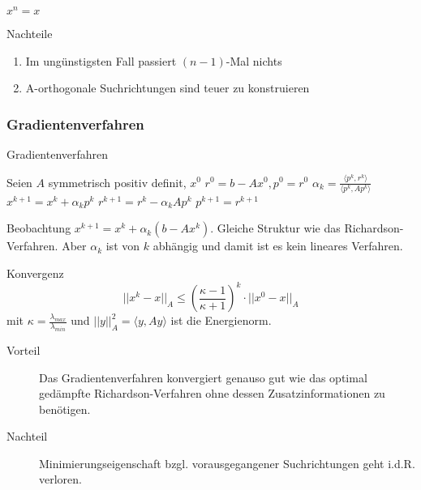 \begin{theorem}
	$x^{n}=x$
\end{theorem}
\begin{remark}
	Nachteile
	\begin{enumerate}
		\item Im ungünstigsten Fall passiert $(n-1)$-Mal nichts
		\item A-orthogonale Suchrichtungen sind teuer zu konstruieren
	\end{enumerate}
\end{remark}

\subsubsection{Gradientenverfahren}

\begin{algorithm}
	\caption{Gradientenverfahren}
	\begin{algorithmic}
		\STATE  Seien $A$ symmetrisch positiv definit, $x^{0}$
		\STATE $r^{0}=b-Ax^{0}, p^{0}=r^{0}$
			\STATE $\alpha_{k} = \frac{\langle p^{k},r^{k}\rangle}{\langle p^{k},Ap^{k}\rangle}$
			\STATE $x^{k+1} = x^{k} + \alpha_{k}p^{k}$
			\STATE $r^{k+1} = r^{k} - \alpha_{k}Ap^{k}$
			\STATE $p^{k+1}=r^{k+1}$
		\ENDFOR
	\end{algorithmic}
\end{algorithm}

\begin{remark}
	Beobachtung $x^{k+1}=x^{k}+\alpha_{k}(b-Ax^{k})$. Gleiche Struktur wie das Richardson-Verfahren. Aber $\alpha_{k}$ ist von $k$
	abhängig und damit ist es kein lineares Verfahren.
\end{remark}

\begin{theorem}
	Konvergenz
	\\
	$$||x^{k}-x||_{A}\leq \left( \frac{\kappa - 1}{\kappa +1}\right)^{k}\cdot || x^{0}-x||_{A}$$
	mit $\kappa = \frac{\lambda_{max}}{\lambda_{min}}$ und $||y||^{2}_{A}=\langle y, Ay \rangle$ ist die Energienorm.
\end{theorem}

\begin{description}
	\item[Vorteil] Das Gradientenverfahren konvergiert genauso gut wie das optimal gedämpfte Richardson-Verfahren ohne dessen Zusatzinformationen
					zu benötigen.
	\item[Nachteil] Minimierungseigenschaft bzgl. vorausgegangener Suchrichtungen geht i.d.R. verloren.
\end{description}

